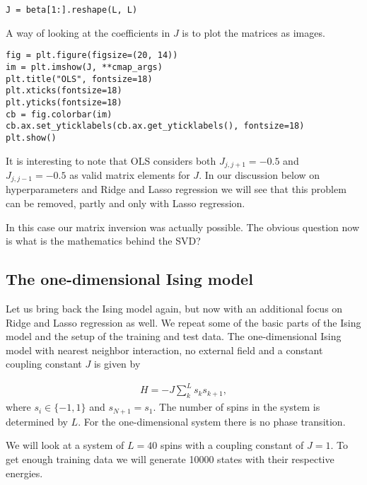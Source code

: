\documentclass[%
oneside,                 %
final,                   %
10pt]{article}
\begin{document}
\begin{verbatim}
J = beta[1:].reshape(L, L)
\end{verbatim}

A way of looking at the coefficients in $J$ is to plot the matrices as images.


\begin{verbatim}
fig = plt.figure(figsize=(20, 14))
im = plt.imshow(J, **cmap_args)
plt.title("OLS", fontsize=18)
plt.xticks(fontsize=18)
plt.yticks(fontsize=18)
cb = fig.colorbar(im)
cb.ax.set_yticklabels(cb.ax.get_yticklabels(), fontsize=18)
plt.show()
\end{verbatim}
It is interesting to note that OLS
considers both $J_{j, j + 1} = -0.5$ and $J_{j, j - 1} = -0.5$ as
valid matrix elements for $J$.
In our discussion below on hyperparameters and Ridge and Lasso regression we will see that
this problem can be removed, partly and only with Lasso regression. 

In this case our matrix inversion was actually possible. The obvious question now is what is the mathematics behind the SVD?





\subsection*{The one-dimensional Ising model}

Let us bring back the Ising model again, but now with an additional
focus on Ridge and Lasso regression as well. We repeat some of the
basic parts of the Ising model and the setup of the training and test
data.  The one-dimensional Ising model with nearest neighbor
interaction, no external field and a constant coupling constant $J$ is
given by

\begin{align}
    H = -J \sum_{k}^L s_k s_{k + 1},
\end{align}
where $s_i \in \{-1, 1\}$ and $s_{N + 1} = s_1$. The number of spins in the system is determined by $L$. For the one-dimensional system there is no phase transition.

We will look at a system of $L = 40$ spins with a coupling constant of $J = 1$. To get enough training data we will generate 10000 states with their respective energies.
\end{document}
